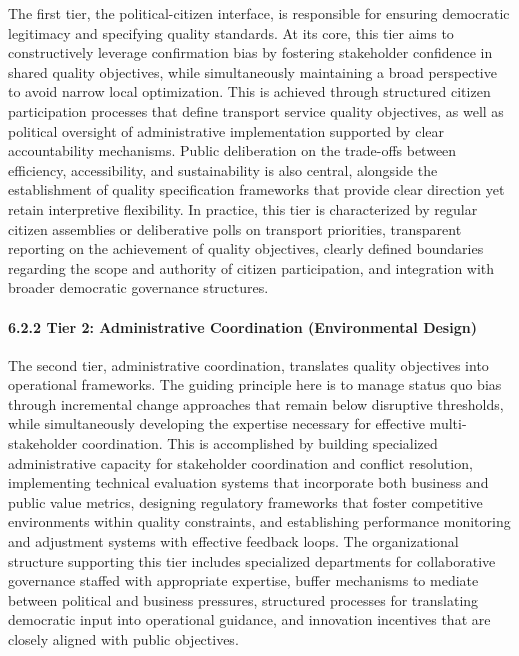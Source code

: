 The first tier, the political-citizen interface, is responsible for
ensuring democratic legitimacy and specifying quality standards. At its
core, this tier aims to constructively leverage confirmation bias by
fostering stakeholder confidence in shared quality objectives, while
simultaneously maintaining a broad perspective to avoid narrow local
optimization. This is achieved through structured citizen participation
processes that define transport service quality objectives, as well as
political oversight of administrative implementation supported by clear
accountability mechanisms. Public deliberation on the trade-offs between
efficiency, accessibility, and sustainability is also central, alongside
the establishment of quality specification frameworks that provide clear
direction yet retain interpretive flexibility. In practice, this tier is
characterized by regular citizen assemblies or deliberative polls on
transport priorities, transparent reporting on the achievement of
quality objectives, clearly defined boundaries regarding the scope and
authority of citizen participation, and integration with broader
democratic governance structures.

\paragraph{6.2.2 Tier 2: Administrative Coordination (Environmental
Design)}\label{tier-2-administrative-coordination-environmental-design}

The second tier, administrative coordination, translates quality
objectives into operational frameworks. The guiding principle here is to
manage status quo bias through incremental change approaches that remain
below disruptive thresholds, while simultaneously developing the
expertise necessary for effective multi-stakeholder coordination. This
is accomplished by building specialized administrative capacity for
stakeholder coordination and conflict resolution, implementing technical
evaluation systems that incorporate both business and public value
metrics, designing regulatory frameworks that foster competitive
environments within quality constraints, and establishing performance
monitoring and adjustment systems with effective feedback loops. The
organizational structure supporting this tier includes specialized
departments for collaborative governance staffed with appropriate
expertise, buffer mechanisms to mediate between political and business
pressures, structured processes for translating democratic input into
operational guidance, and innovation incentives that are closely aligned
with public objectives.

